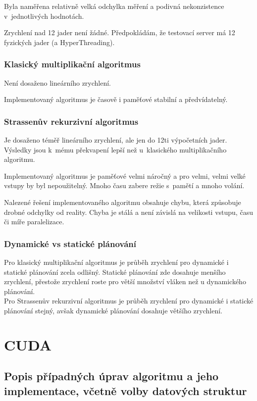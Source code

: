 \documentclass[12pt,a4paper]{article}
\begin{document}
Byla naměřena relativně velká odchylka měření a podivná nekonzistence v~jednotlivých hodnotách. 
\bigskip

Zrychlení nad 12 jader není žádné. Předpokládám, že testovací server má 12 fyzických jader (a HyperThreading).

\subsubsection{Klasický multiplikační algoritmus}

Není dosaženo lineárního zrychlení.
\bigskip

Implementovaný algoritmus je časově i paměťové stabilní a předvídatelný.


\subsubsection{Strassenův rekurzivní algoritmus}

Je dosaženo téměř lineárního zrychlení, ale jen do 12ti výpočetních jader. Výsledky jsou k~mému překvapení lepší než u~klasického multiplikačního algoritmu.
\bigskip

Implementovaný algoritmus je paměťové velmi náročný a pro velmi, velmi velké vstupy by byl nepoužitelný. Mnoho času zabere režie s~pamětí a mnoho volání.
\bigskip

Nalezené řešení implementovaného algoritmu obsahuje chybu, která způsobuje drobné odchylky od reality. Chyba je stálá a není závislá na velikosti vstupu, času či míře paralelizace.

\subsubsection{Dynamické vs statické plánování}


Pro klasický multiplikační algoritmus je průběh zrychlení pro dynamické i statické plánování zcela odlišný. Statické plánování zde dosahuje menšího zrychlení, přestože zrychlení roste pro větší množství vláken než u dynamického plánování. \\


Pro Strassenův rekurzivní algoritmus je průběh zrychlení pro dynamické i statické plánování stejný, avšak dynamické plánování dosahuje většího zrychlení.


\section{CUDA}
\subsection{Popis případných úprav algoritmu a jeho implementace, včetně volby datových struktur}
\end{document}
